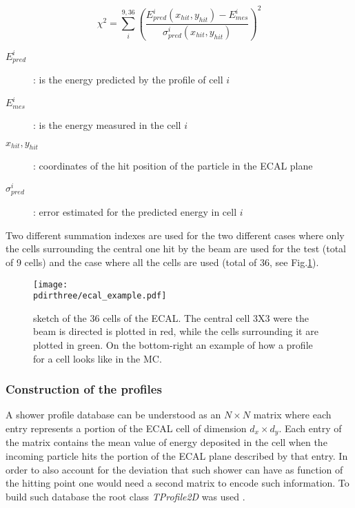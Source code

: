 \begin{equation}
  \chi^2 = \sum^{9,36}_i \left(\frac{E_{pred}^i(x_{hit},y_{hit})-E_{mes}^i}{\sigma^{i}_{pred}(x_{hit},y_{hit})}\right)^2
  \label{eqn:chi}
\end{equation}


\begin{description}
\item[$E_{pred}^i$]: is the energy predicted by the profile of cell
  $i$
\item[$E_{mes}^i$]: is the energy measured in the cell $i$
\item[$x_{hit},y_{hit}$]: coordinates of the hit position of the
  particle in the ECAL plane
\item [$\sigma^{i}_{pred}$]: error estimated for the predicted energy
  in cell $i$
\end{description}


Two different summation indexes are used for the two different cases
where only the cells surrounding the central one hit by the beam are
used for the test (total of 9 cells) and the case where all the cells
are used (total of 36, see Fig.\ref{fig:ecal_example}).

\begin{figure}[h!]
  \begin{center}
    \texttt{[image: \\pdirthree/ecal\_example.pdf]}
  \end{center}
  \caption[ECAL sketch]{sketch of the 36 cells of the ECAL. The central cell 3X3
    were the beam is directed is plotted in red, while the cells
    surrounding it are plotted in green. On the bottom-right an
    example of how a profile for a cell looks like in the MC.}
  \label{fig:ecal_example}
\end{figure}


 
\subsubsection{Construction of the profiles}
\label{ch3:sec:make_profile}

A shower profile database can be understood as an $N\times N$ matrix
where each entry represents a portion of the ECAL cell of dimension
$d_x \times d_y$. Each entry of the matrix contains the mean value of
energy deposited in the cell when the incoming particle hits the
portion of the ECAL plane described by that entry. In order to also
account for the deviation that such shower can have as function of the
hitting point one would need a second matrix to encode such
information. To build such database the root class \textit{TProfile2D} was used \cite{root-tprofile}.

